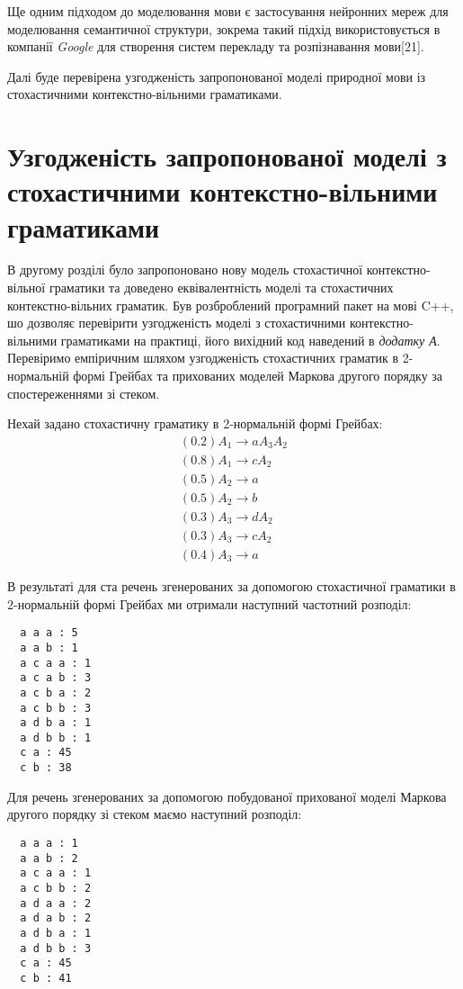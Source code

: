 Ще одним підходом до моделювання мови є застосування нейронних мереж для моделювання семантичної структури, зокрема такий підхід використовується в компанії \textit{Google} для створення систем перекладу та розпізнавання мови[21].

Далі буде перевірена узгодженість запропонованої моделі природної мови із стохастичними контекстно-вільними граматиками.
\section{Узгодженість запропонованої моделі з стохастичними контекстно-вільними граматиками}
В другому розділі було запропоновано нову модель стохастичної контекстно-вільної граматики та доведено еквівалентність моделі та стохастичних контекстно-вільних граматик.
Був розброблений програмний пакет на мові C++, шо дозволяє перевірити узгодженість моделі з стохастичними контекстно-вільними граматиками на практиці, його вихідний код наведений в \textit{додатку А}.
Перевіримо емпіричним шляхом узгодженість стохастичних граматик в 2-нормальній формі Грейбах та прихованих моделей Маркова другого порядку за спостереженнями зі стеком.
\begin{example}
  Нехай задано стохастичну граматику в 2-нормальній формі Грейбах:
\begin{align*}
  (0.2) A_1 \rightarrow a A_3 A_2 \\
  (0.8) A_1 \rightarrow c A_2 \\
  (0.5) A_2 \rightarrow a \\
  (0.5) A_2 \rightarrow b \\
  (0.3) A_3 \rightarrow d A_2 \\
  (0.3) A_3 \rightarrow c A_2 \\
  (0.4) A_3 \rightarrow a
\end{align*}
\end{example}

В результаті для ста речень згенерованих за допомогою стохастичної граматики в 2-нормальній формі Грейбах ми отримали наступний частотний розподіл:\\
\begin{verbatim}
  a a a : 5
  a a b : 1
  a c a a : 1
  a c a b : 3
  a c b a : 2
  a c b b : 3
  a d b a : 1
  a d b b : 1
  c a : 45
  c b : 38
\end{verbatim}

Для речень згенерованих за допомогою побудованої прихованої моделі Маркова другого порядку зі стеком маємо наступний розподіл:\\
\begin{verbatim}
  a a a : 1
  a a b : 2
  a c a a : 1
  a c b b : 2
  a d a a : 2
  a d a b : 2
  a d b a : 1
  a d b b : 3
  c a : 45
  c b : 41
\end{verbatim}

